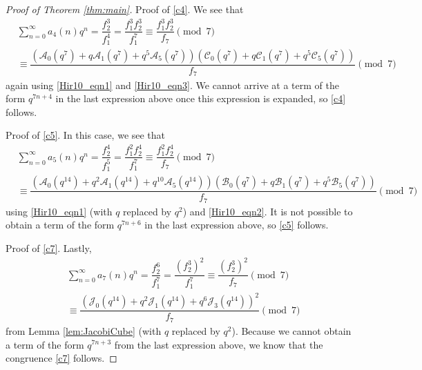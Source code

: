 \documentclass[10pt, reqno]{amsart}
\theoremstyle{theorem}
\theoremstyle{definition}
\theoremstyle{example}
\begin{document}
\begin{proof}[Proof of Theorem \ref{thm:main}]
\noindent
Proof of \eqref{c4}.
We see that 
\begin{align*}
&
\sum_{n=0}^\infty a_4(n)q^n =
\dfrac{f_2^3}{f_1^4} 
=
\dfrac{f_1^3f_2^3}{f_1^7} 
\equiv 
\dfrac{f_1^3f_2^3}{f_7} \pmod{7}   \\ %
&\equiv
\dfrac{ \left(\mathcal{A}_0(q^7) + q\mathcal{A}_1(q^7)+q^5\mathcal{A}_5(q^7)\right) \left(\mathcal{C}_0(q^7) + q\mathcal{C}_1(q^7)+q^5\mathcal{C}_5(q^7)\right)  }{f_7} \pmod{7}
\end{align*}
again using \eqref{Hir10_eqn1} and \eqref{Hir10_eqn3}.   We cannot arrive at a term of the form $q^{7n+4}$ in the last expression above once this expression is expanded, so \eqref{c4} follows.


\medskip 

\noindent
Proof of \eqref{c5}.
In this case, we see that 
\begin{align*}
&
\sum_{n=0}^\infty a_5(n)q^n =
\dfrac{f_2^4}{f_1^5} 
=
\dfrac{f_1^2f_2^4}{f_1^7} 
\equiv
\dfrac{f_1^2f_2^4}{f_7}  \pmod{7}   \\ %
&\equiv 
\dfrac{ \left( \mathcal{A}_0(q^{14}) + q^2\mathcal{A}_1(q^{14})+q^{10}\mathcal{A}_5(q^{14}) \right)  \left( \mathcal{B}_0(q^7) + q\mathcal{B}_1(q^7)+q^5\mathcal{B}_5(q^7) \right) }{f_7} \pmod{7}
\end{align*}
using \eqref{Hir10_eqn1}  (with $q$ replaced by $q^2$) and \eqref{Hir10_eqn2}.  It is not possible to obtain a term of the form $q^{7n+6}$ in the last expression above, so \eqref{c5} follows.  

\medskip 

\noindent
Proof of \eqref{c7}.  
Lastly, 
\begin{align*}
& \sum_{n=0}^\infty a_7(n)q^n 
=
\dfrac{f_2^6}{f_1^7} 
=
\dfrac{(f_2^3)^2}{f_1^7} 
\equiv 
\dfrac{(f_2^3)^2}{f_7}  \pmod{7}   \\ %
&\equiv
\dfrac{\left( \mathcal{J}_0(q^{14}) + q^2\mathcal{J}_1(q^{14}) + q^6\mathcal{J}_3(q^{14}) \right)^2}{f_7} \pmod{7}
\end{align*}
from Lemma \ref{lem:JacobiCube} (with $q$ replaced by $q^2$).   Because we cannot obtain a term of the form $q^{7n+3}$ from the last expression above, we know that the congruence \eqref{c7} follows.  

\end{proof}
\end{document}
